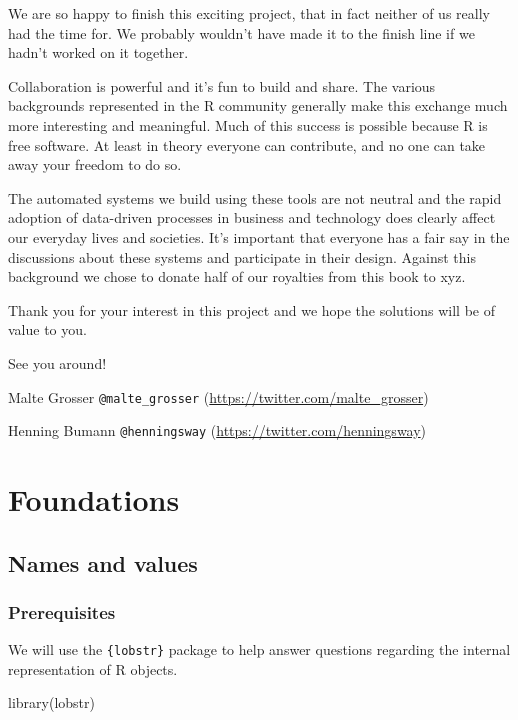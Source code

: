 \documentclass[
]{krantz}
\makeatletter
\newenvironment{Shaded}{\begin{snugshade}}{\end{snugshade}}
\newcommand{\KeywordTok}[1]{\textcolor[rgb]{0.13,0.29,0.53}{\textbf{#1}}}
\newcommand{\NormalTok}[1]{#1}
\renewcommand{\href}[2]{#2 (\url{#1})}
\newenvironment{kframe}{%
\medskip{}
\setlength{\fboxsep}{.8em}
 \def\at@end@of@kframe{}%
 \ifinner\ifhmode%
  \def\at@end@of@kframe{\end{minipage}}%
  \begin{minipage}{\columnwidth}%
 \fi\fi%
 \def\FrameCommand##1{\hskip\@totalleftmargin \hskip-\fboxsep
 \colorbox{shadecolor}{##1}\hskip-\fboxsep
     \hskip-\linewidth \hskip-\@totalleftmargin \hskip\columnwidth}%
 \MakeFramed {\advance\hsize-\width
   \@totalleftmargin\z@ \linewidth\hsize
   \@setminipage}}%
 {\par\unskip\endMakeFramed%
 \at@end@of@kframe}
\renewenvironment{Shaded}{\begin{kframe}}{\end{kframe}}
\renewcommand{\KeywordTok} [1]{\textcolor[rgb]{0.00,0.44,0.13}{{#1}}}
\renewcommand{\NormalTok}  [1]{{#1}}
\makeatother
\begin{document}
We are so happy to finish this exciting project, that in fact neither of us really had the time for. We probably wouldn't have made it to the finish line if we hadn't worked on it together.

Collaboration is powerful and it's fun to build and share. The various backgrounds represented in the R community generally make this exchange much more interesting and meaningful. Much of this success is possible because R is free software. At least in theory everyone can contribute, and no one can take away your freedom to do so.

The automated systems we build using these tools are not neutral and the rapid adoption of data-driven processes in business and technology does clearly affect our everyday lives and societies. It's important that everyone has a fair say in the discussions about these systems and participate in their design. Against this background we chose to donate half of our royalties from this book to xyz.

Thank you for your interest in this project and we hope the solutions will be of value to you.

See you around!

Malte Grosser \href{https://twitter.com/malte_grosser}{\texttt{@malte\_grosser}}

Henning Bumann \href{https://twitter.com/henningsway}{\texttt{@henningsway}}

\hypertarget{part-foundations}{%
\part{Foundations}\label{part-foundations}}

\hypertarget{names-and-values}{%
\chapter{Names and values}\label{names-and-values}}

\hypertarget{prerequisites}{%
\section*{Prerequisites}\label{prerequisites}}


We will use the \texttt{\{lobstr\}} package to help answer questions regarding the internal representation of R objects.

\begin{Shaded}
\begin{Highlighting}[]
\KeywordTok{library}\NormalTok{(lobstr) }
\end{Highlighting}
\end{Shaded}
\end{document}
